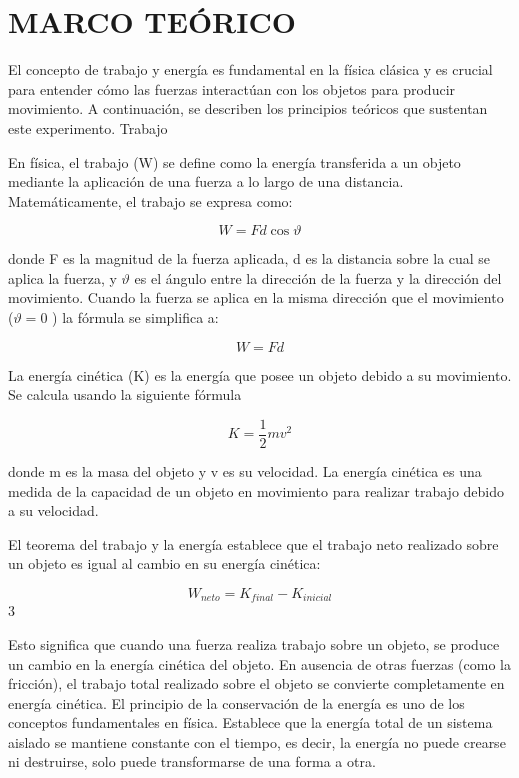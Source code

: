 \documentclass[journal]{IEEEtran}
\begin{document}
\section{MARCO TEÓRICO}
El concepto de trabajo y energía es fundamental en la física clásica y es crucial para entender cómo las fuerzas interactúan con los objetos para producir movimiento. A continuación, se describen los principios teóricos que sustentan este experimento.
Trabajo

En física, el trabajo (W) se define como la energía transferida a un objeto mediante la aplicación de una fuerza a lo largo de una distancia. Matemáticamente, el trabajo se expresa como:

\begin{equation}\label{eq:1}
 W= Fd\cos\vartheta
\end{equation}

donde F es la magnitud de la fuerza aplicada, 
d es la distancia sobre la cual se aplica la fuerza, y 
\(\vartheta\) es el ángulo entre la dirección de la fuerza y la dirección del movimiento. Cuando la fuerza se aplica en la misma dirección que el movimiento (\(\vartheta = 0\) ) la fórmula se simplifica a:

\begin{equation}\label{eq:2}
 W= Fd
\end{equation}

La energía cinética (K) es la energía que posee un objeto debido a su movimiento. Se calcula usando la siguiente fórmula

\begin{equation}\label{eq:2}
 K=\frac{1}{2}mv^{2}
\end{equation}
 
donde 
m es la masa del objeto y 
v es su velocidad. La energía cinética es una medida de la capacidad de un objeto en movimiento para realizar trabajo debido a su velocidad.

El teorema del trabajo y la energía establece que el trabajo neto realizado sobre un objeto es igual al cambio en su energía cinética:

\begin{equation}\label{eq:4}
W_{neto}= K_{final} - K_{inicial}
\end{equation}3

Esto significa que cuando una fuerza realiza trabajo sobre un objeto, se produce un cambio en la energía cinética del objeto. En ausencia de otras fuerzas (como la fricción), el trabajo total realizado sobre el objeto se convierte completamente en energía cinética.
El principio de la conservación de la energía es uno de los conceptos fundamentales en física. Establece que la energía total de un sistema aislado se mantiene constante con el tiempo, es decir, la energía no puede crearse ni destruirse, solo puede transformarse de una forma a otra.
\end{document}
